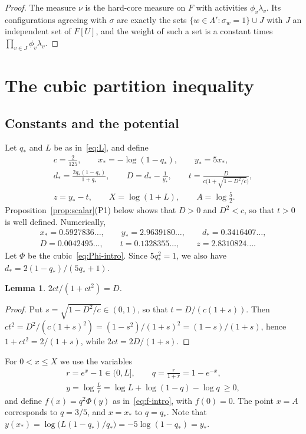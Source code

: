 \documentclass{amsart}
\numberwithin{equation}{section}
\numberwithin{table}{section}
\newtheorem{lemma}[theorem]{Lemma}
\theoremstyle{definition}
\theoremstyle{remark}
\newcommand{\qs}{q_{\ast}}
\newcommand{\xs}{x_{\ast}}
\newcommand{\ys}{y_{\ast}}
\newcommand{\ds}{d_{\ast}}
\begin{document}
\begin{proof}
The measure $\nu$ is the hard-core measure on $F$ with activities $\phi_v\lambda_v$. Its configurations agreeing with $\sigma$ are exactly the sets $\{w\in\Lambda':\sigma_w=1\}\cup J$ with $J$ an independent set of $F[U]$, and the weight of such a set is a constant times $\prod_{v\in J}\phi_v\lambda_v$.
\end{proof}

\section{The cubic partition inequality}\label{sec:partition}

\subsection{Constants and the potential}
Let $\qs$ and $L$ be as in~\eqref{eq:L}, and define
\begin{equation}\label{eq:constants}
\begin{gathered}
c=\frac{2}{125},\qquad \xs=-\log(1-\qs),\qquad \ys=5\xs,\\
\ds=\frac{2\qs(1-\qs)}{1+\qs},\qquad D=\ds-\frac1{\ys},\qquad t=\frac{D}{c\bigl(1+\sqrt{1-D^2/c}\bigr)},\\
z=\ys-t,\qquad X=\log(1+L),\qquad A=\log\tfrac52 .
\end{gathered}
\end{equation}
Proposition~\ref{prop:scalar}(P1) below shows that $D>0$ and $D^2<c$, so that $t>0$ is well defined. Numerically,
\begin{gather*}
\xs=0.5927836\ldots,\qquad \ys=2.9639180\ldots,\qquad \ds=0.3416407\ldots,\\
D=0.0042495\ldots,\qquad t=0.1328355\ldots,\qquad z=2.8310824\ldots .
\end{gather*}
Let $\Phi$ be the cubic~\eqref{eq:Phi-intro}. Since $5\qs^2=1$, we also have $\ds=2(1-\qs)/(5\qs+1)$.

\begin{lemma}\label{lem:t}
$2ct/(1+ct^2)=D$.
\end{lemma}

\begin{proof}
Put $s=\sqrt{1-D^2/c}\in(0,1)$, so that $t=D/(c(1+s))$. Then $ct^2=D^2/(c(1+s)^2)=(1-s^2)/(1+s)^2=(1-s)/(1+s)$, hence $1+ct^2=2/(1+s)$, while $2ct=2D/(1+s)$.
\end{proof}

For $0<x\le X$ we use the variables
\begin{equation}\label{eq:qy}
\begin{gathered}
r=e^x-1\in(0,L],\qquad q=\frac{r}{1+r}=1-e^{-x},\\
y=\log\frac Lr=\log L+\log(1-q)-\log q\ \ge 0,
\end{gathered}
\end{equation}
and define $f(x)=q^2\Phi(y)$ as in~\eqref{eq:f-intro}, with $f(0)=0$. The point $x=A$ corresponds to $q=3/5$, and $x=\xs$ to $q=\qs$. Note that $y(\xs)=\log\bigl(L(1-\qs)/\qs\bigr)=-5\log(1-\qs)=\ys$.
\end{document}
